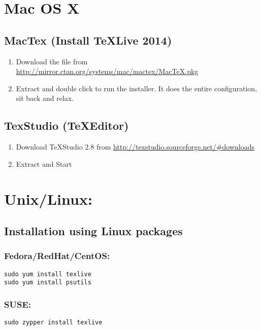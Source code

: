 \documentclass[times,twoside,11pt]{article}
\begin{document}
\section*{Mac OS X}
\subsection*{MacTex (Install \TeX Live 2014)}
\begin{enumerate}
\item	
	Download the file from 
	\url{http://mirror.ctan.org/systems/mac/mactex/MacTeX.pkg}
\item	
	Extract and double click to run the installer. It does the entire 
	configuration, sit back and relax.
\end{enumerate}

\subsection*{TexStudio (\TeX Editor)}
\begin{enumerate}
\item	
	Download \TeX Studio 2.8 from 
	\url{http://texstudio.sourceforge.net/\#downloads}
 
\item
	Extract and Start
\end{enumerate}


\section*{Unix/Linux:}

\subsection*{Installation using Linux packages} 
\subsubsection*{Fedora/RedHat/CentOS:}
\begin{lstlisting}[style=shell]
sudo yum install texlive 
sudo yum install psutils 
\end{lstlisting}


\subsubsection*{SUSE:}
\begin{lstlisting}[style=shell]
sudo zypper install texlive
\end{lstlisting}
\end{document}
